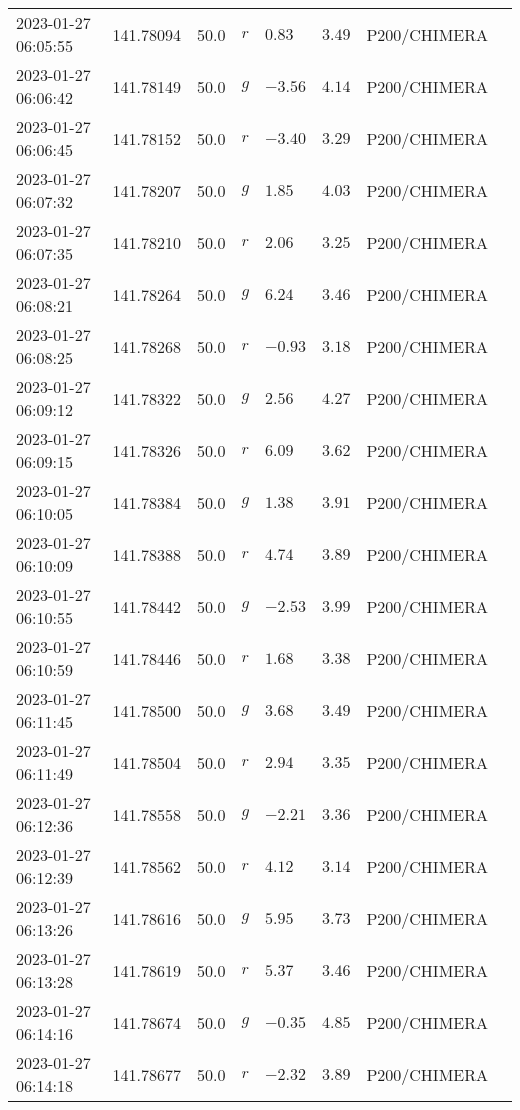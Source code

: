 \documentclass{nature_plusfigure}
\begin{document}
\begin{supplement}
\begin{center}
\begin{longtable}{llllllll}
2023-01-27 06:05:55 & 141.78094 & 50.0 & $r$ & $0.83$ & $3.49$ & P200/CHIMERA &  \\ 
2023-01-27 06:06:42 & 141.78149 & 50.0 & $g$ & $-3.56$ & $4.14$ & P200/CHIMERA &  \\ 
2023-01-27 06:06:45 & 141.78152 & 50.0 & $r$ & $-3.40$ & $3.29$ & P200/CHIMERA &  \\ 
2023-01-27 06:07:32 & 141.78207 & 50.0 & $g$ & $1.85$ & $4.03$ & P200/CHIMERA &  \\ 
2023-01-27 06:07:35 & 141.78210 & 50.0 & $r$ & $2.06$ & $3.25$ & P200/CHIMERA &  \\ 
2023-01-27 06:08:21 & 141.78264 & 50.0 & $g$ & $6.24$ & $3.46$ & P200/CHIMERA &  \\ 
2023-01-27 06:08:25 & 141.78268 & 50.0 & $r$ & $-0.93$ & $3.18$ & P200/CHIMERA &  \\ 
2023-01-27 06:09:12 & 141.78322 & 50.0 & $g$ & $2.56$ & $4.27$ & P200/CHIMERA &  \\ 
2023-01-27 06:09:15 & 141.78326 & 50.0 & $r$ & $6.09$ & $3.62$ & P200/CHIMERA &  \\ 
2023-01-27 06:10:05 & 141.78384 & 50.0 & $g$ & $1.38$ & $3.91$ & P200/CHIMERA &  \\ 
2023-01-27 06:10:09 & 141.78388 & 50.0 & $r$ & $4.74$ & $3.89$ & P200/CHIMERA &  \\ 
2023-01-27 06:10:55 & 141.78442 & 50.0 & $g$ & $-2.53$ & $3.99$ & P200/CHIMERA &  \\ 
2023-01-27 06:10:59 & 141.78446 & 50.0 & $r$ & $1.68$ & $3.38$ & P200/CHIMERA &  \\ 
2023-01-27 06:11:45 & 141.78500 & 50.0 & $g$ & $3.68$ & $3.49$ & P200/CHIMERA &  \\ 
2023-01-27 06:11:49 & 141.78504 & 50.0 & $r$ & $2.94$ & $3.35$ & P200/CHIMERA &  \\ 
2023-01-27 06:12:36 & 141.78558 & 50.0 & $g$ & $-2.21$ & $3.36$ & P200/CHIMERA &  \\ 
2023-01-27 06:12:39 & 141.78562 & 50.0 & $r$ & $4.12$ & $3.14$ & P200/CHIMERA &  \\ 
2023-01-27 06:13:26 & 141.78616 & 50.0 & $g$ & $5.95$ & $3.73$ & P200/CHIMERA &  \\ 
2023-01-27 06:13:28 & 141.78619 & 50.0 & $r$ & $5.37$ & $3.46$ & P200/CHIMERA &  \\ 
2023-01-27 06:14:16 & 141.78674 & 50.0 & $g$ & $-0.35$ & $4.85$ & P200/CHIMERA &  \\ 
2023-01-27 06:14:18 & 141.78677 & 50.0 & $r$ & $-2.32$ & $3.89$ & P200/CHIMERA &  \\ 

\end{longtable}
\end{center}
\end{supplement}
\end{document}
